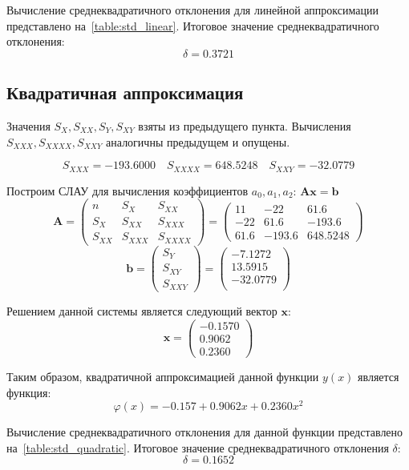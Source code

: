 Вычисление среднеквадратичного отклонения для линейной
аппроксимации представлено на~\cref{table:std_linear}.
Итоговое значение среднеквадратичного отклонения:
\[
  \delta = 0.3721
\]

\subsection{Квадратичная аппроксимация}

Значения \(S_X, S_{XX}, S_{Y}, S_{XY}\) взяты из предыдущего пункта.
Вычисления \(S_{XXX}, S_{XXXX}, S_{XXY}\) аналогичны предыдущем и опущены.

\[
  S_{XXX} = -193.6000
  \quad
  S_{XXXX} = 648.5248
  \quad
  S_{XXY} = -32.0779
\]

Построим СЛАУ для вычисления коэффициентов \(a_0, a_1, a_2\):
\( \mathbf{A} \mathbf{x} = \mathbf{b} \)
\[
  \mathbf{A} = \begin{pmatrix}
    n & S_X & S_{XX} \\
    S_X & S_{XX} & S_{XXX} \\
    S_{XX} & S_{XXX} & S_{XXXX}
  \end{pmatrix} =
  \begin{pmatrix}
    11 & -22 & 61.6 \\ 
    -22 & 61.6 & -193.6 \\
    61.6 & -193.6 & 648.5248
  \end{pmatrix}
\]
\[
  \mathbf{b} = \begin{pmatrix}
    S_Y \\
    S_{XY} \\
    S_{XXY}
  \end{pmatrix} =
  \begin{pmatrix}
    -7.1272 \\
    13.5915 \\
    -32.0779 \\
  \end{pmatrix}
\]

Решением данной системы является следующий вектор \(\mathbf{x}\):
\[
  \mathbf{x} = \begin{pmatrix}
    -0.1570 \\
    0.9062 \\
    0.2360
  \end{pmatrix}
\]

Таким образом, квадратичной аппроксимацией данной функции \(y(x)\)
является функция:
\[
  \varphi(x) = -0.157 + 0.9062 x + 0.2360 x^2
\]

Вычисление среднеквадратичного отклонения для данной функции
представлено на~\cref{table:std_quadratic}.
Итоговое значение среднеквадратичного отклонения \(\delta\):
\[
  \delta = 0.1652
\]

